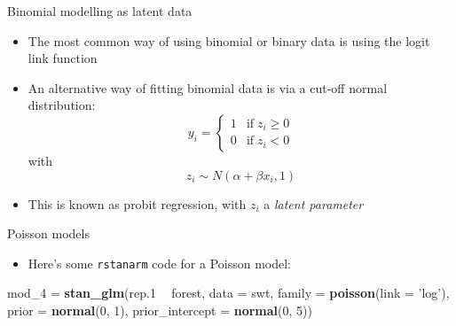 \documentclass[ignorenonframetext,]{beamer}
\newenvironment{Shaded}{\begin{snugshade}}{\end{snugshade}}
\newcommand{\KeywordTok}[1]{\textcolor[rgb]{0.13,0.29,0.53}{\textbf{#1}}}
\newcommand{\DataTypeTok}[1]{\textcolor[rgb]{0.13,0.29,0.53}{#1}}
\newcommand{\DecValTok}[1]{\textcolor[rgb]{0.00,0.00,0.81}{#1}}
\newcommand{\StringTok}[1]{\textcolor[rgb]{0.31,0.60,0.02}{#1}}
\newcommand{\OperatorTok}[1]{\textcolor[rgb]{0.81,0.36,0.00}{\textbf{#1}}}
\newcommand{\NormalTok}[1]{#1}
\providecommand{\tightlist}{%
  \setlength{\itemsep}{0pt}\setlength{\parskip}{0pt}}
\begin{document}
\begin{frame}{Binomial modelling as latent data}

\begin{itemize}
\tightlist
\item
  The most common way of using binomial or binary data is using the
  logit link function
\item
  An alternative way of fitting binomial data is via a cut-off normal
  distribution:
  \[y_i = \left\{ \begin{array}{ll} 1 & \mbox{if}\; z_i \ge0 \\ 0 & \mbox{if}\; z_i<0 \end{array} \right.\]
  with \[z_i \sim N(\alpha + \beta x_i, 1)\]
\item
  This is known as probit regression, with \(z_i\) a \emph{latent
  parameter}
\end{itemize}

\end{frame}

\begin{frame}[fragile]{Poisson models}

\begin{itemize}
\tightlist
\item
  Here's some \texttt{rstanarm} code for a Poisson model:
\end{itemize}

\begin{Shaded}
\begin{Highlighting}[]
\NormalTok{mod_}\DecValTok{4}\NormalTok{ =}\StringTok{ }\KeywordTok{stan_glm}\NormalTok{(rep.}\DecValTok{1} \OperatorTok{~}\StringTok{ }\NormalTok{forest, }
                 \DataTypeTok{data =}\NormalTok{ swt,}
                 \DataTypeTok{family =} \KeywordTok{poisson}\NormalTok{(}\DataTypeTok{link =} \StringTok{'log'}\NormalTok{),}
                 \DataTypeTok{prior =} \KeywordTok{normal}\NormalTok{(}\DecValTok{0}\NormalTok{, }\DecValTok{1}\NormalTok{),}
                 \DataTypeTok{prior_intercept =} \KeywordTok{normal}\NormalTok{(}\DecValTok{0}\NormalTok{, }\DecValTok{5}\NormalTok{))}
\end{Highlighting}
\end{Shaded}

\end{frame}
\end{document}
